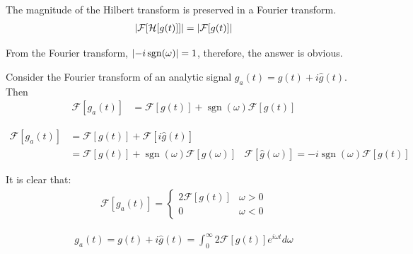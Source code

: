 \documentclass[12pt, english]{book}
\makeatletter
\renewenvironment{proof}[1][\proofname]{\par
	\pushQED{\qed}%
	\normalfont \topsep6\p@\@plus6\p@\relax
	\list{}{%
		\settowidth{\leftmargin}{\itshape\proofname:\hskip\labelsep}%
		\setlength{\labelwidth}{0pt}%
		\setlength{\itemindent}{-\leftmargin}%
		}%
	\item[\hskip\labelsep\itshape#1\@addpunct{:}]\ignorespaces
	}{\popQED\endlist\@endpefalse}
\makeatother
\begin{document}
	\begin{lemma}
		The magnitude of the Hilbert transform is preserved in a Fourier transform.
		\begin{align*}
			\abs{\mathcal{F}[\mathcal{H}[g(t)]]} = \abs{\mathcal{F}[g(t)]}
		\end{align*}
	\end{lemma}
	\begin{proof}
		From the Fourier transform, \(\abs{-i \operatorname{sgn}(\omega)} = 1\), therefore, the answer is obvious. 
	\end{proof}
	
	\begin{theorem}
		\label{Fourier Transform af an Analytic Signal Theorem - Complex}
		Consider the Fourier transform of an analytic signal \(g_a(t) = g(t) + i \hat{g}(t)\). Then
		\begin{align*}
			\mathcal{F}[g_a(t)] 
			&= \mathcal{F}[g(t)] + \operatorname{sgn}(\omega)\mathcal{F}[g(t)] 
		\end{align*}
	\end{theorem}
	\begin{proof}
		\begin{align*}
			\mathcal{F}[g_a(t)] 
			&= \mathcal{F}[g(t)] + \mathcal{F}[i\hat{g}(t)] \\
			&= \mathcal{F}[g(t)] + \operatorname{sgn}(\omega) \mathcal{F}[g(\omega)]
				& \mathcal{F}[\hat{g}(\omega)] = -i \operatorname{sgn}(\omega) \mathcal{F}[g(t)] 
		\end{align*}
	\end{proof}
	
	It is clear that:
	\begin{align*}
		\mathcal{F}[g_a(t)] 
		= \begin{cases}
			2 \mathcal{F}[g(t)] & \omega > 0 \\
			0 					& \omega < 0
		\end{cases}
	\end{align*}

	\begin{corollary}
		\begin{align*}
			g_a (t) = g(t) + i \hat{g}(t) = \int_{0}^{\infty} 2 \mathcal{F}[g(t)] e^{i\omega t} d\omega
		\end{align*}
	\end{corollary}
\end{document}
